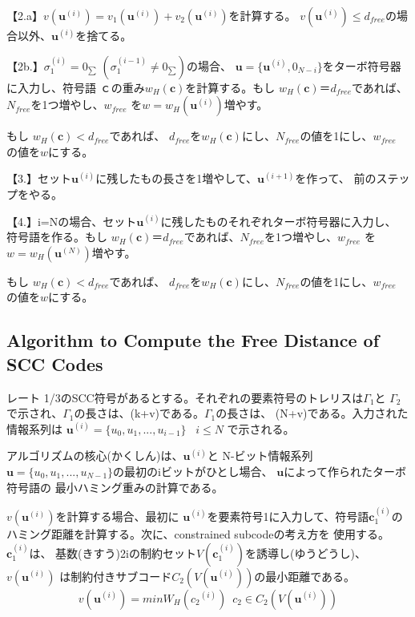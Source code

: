 \documentclass[20 pts]{article}
\begin{document}
【2.a】$\mathit{v(\mathbf{u}^{(i)})}=\mathit{v_1(\mathbf{u}^{(i)})}+
\mathit{v_2(\mathbf{u}^{(i)})}$を計算する。
$\mathit{v}(\mathbf{u}^{(i)}) \leq d_{free}$の場合以外、$\mathbf{u}^{(i)}$を捨てる。

【2b.】$\sigma_1^{(i)}=0_{\sum}\,\,(\sigma_1^{(i-1)}\neq 0_{\sum})$の場合、
$\mathbf{u}=\{ \mathbf{u}^{(i)},0_{N-i}\}$をターボ符号器に入力し、符号語
$\mathbf{ｃ}$の重み$\mathit{w}_H(\mathbf{c})$を計算する。もし
$\mathit{w}_H(\mathbf{c})＝d_{free}$であれば、$N_{free}$を1つ増やし、$w_{free}$
を$w=\mathit{w}_H(\mathbf{u}^{(i)})$増やす。

もし
$\mathit{w}_H(\mathbf{c})<d_{free}$であれば、
$d_{free}$を$\mathit{w}_H(\mathbf{c})$にし、$N_{free}$の値を1にし、$w_{free}$
の値を$w$にする。

【3.】セット$\mathbf{u}^{(i)}$に残したもの長さを1増やして、$\mathbf{u}^{(i+1)}$を作って、
前のステップをやる。

【4.】i=Nの場合、セット$\mathbf{u}^{(i)}$に残したものそれぞれターボ符号器に入力し、
符号語を作る。もし
$\mathit{w}_H(\mathbf{c})＝d_{free}$であれば、$N_{free}$を1つ増やし、$w_{free}$
を$w=\mathit{w}_H(\mathbf{u}^{(N)})$増やす。

もし
$\mathit{w}_H(\mathbf{c})<d_{free}$であれば、
$d_{free}$を$\mathit{w}_H(\mathbf{c})$にし、$N_{free}$の値を1にし、$w_{free}$
の値を$w$にする。


\subsection{Algorithm to Compute the Free Distance of SCC Codes}
レート 1/3のSCC符号があるとする。それぞれの要素符号のトレリスは$\Gamma_1$と
$\Gamma_2$で示され、$\Gamma_1$の長さは、(k+v)である。$\Gamma_1$の長さは、
(N+v)である。入力された情報系列は
$\mathbf{u}^{(i)}=\{u_0,u_1,...,u_{i-1}\}\,\,\,\,\, i\leq N$ で示される。

アルゴリズムの核心(かくしん)は、$\mathbf{u}^{(i)}$と
N-ビット情報系列$\mathbf{u}=\{u_0,u_1,...,u_{N-1}\}$の最初のiビットがひとし場合、
$\mathbf{u}$によって作られたターボ符号語の
最小ハミング重みの計算である。



$\mathit{v(\mathbf{u}^{(i)})}$を計算する場合、最初に
$\mathbf{u}^{(i)}$を要素符号1に入力して、符号語$\mathbf{c}_1^{(i)}$の
ハミング距離を計算する。次に、constrained subcodeの考え方を
使用する。$\mathbf{c}_1^{(i)}$は、
基数(きすう)2iの制約セット$V(\mathbf{c}_1^{(i)})$を誘導し(ゆうどうし)、$\mathit{v(\mathbf{u}^{(i)})}$
は制約付きサブコード$\mathit{C}_2(V(\mathbf{u}^{(i)}))$の最小距離である。
$$\mathit{v}(\mathbf{u}^{(i)}) = min\mathit{W}_H({c_2}^{(i)})\,\,\, c_2 \in
\mathit{C}_2(V(\mathbf{u}^{(i)}))$$
\end{document}
